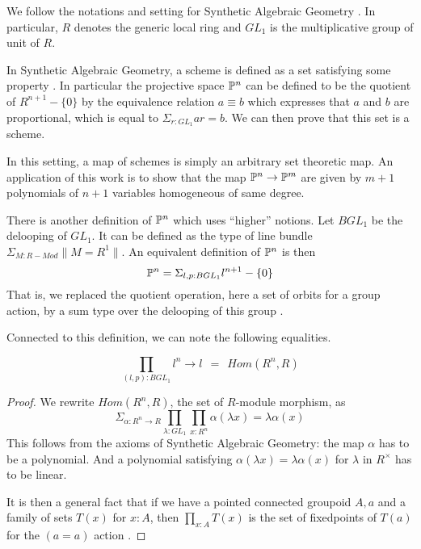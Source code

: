 We follow the notations and setting for Synthetic Algebraic Geometry \cite{draft}.
In particular, $R$ denotes the generic local ring and $GL_1$ is the multiplicative group of unit of $R$.

In Synthetic Algebraic Geometry, a scheme is defined as a set satisfying some property \cite{draft}. In particular
the projective space $\mathbb{P}^n$ can be defined to be the quotient of $R^{n+1}-\{0\}$ by the
equivalence relation $a\equiv b$ which expresses that $a$ and $b$ are proportional, %
which is equal to $\Sigma_{r:GL_1}ar = b$. We can then prove \cite{draft}
that this set is a scheme.

 In this setting, a map of schemes is simply an arbitrary set theoretic map. An application of this work is to show
 that the map $\mathbb{P}^n\rightarrow \mathbb{P}^m$ are given by $m+1$ polynomials of $n+1$ variables homogeneous of same degree.

\medskip


There is another definition of $\mathbb{P}^n$ which uses ``higher'' notions. Let $BGL_1$ be the delooping
of $GL_1$. It can be defined as the type of line bundle $\Sigma_{M:R-Mod}\|{M=R^1}\|$.
An equivalent definition of $\mathbb{P}^n$ is then \cite{Sym}
$$
\mathbb{P}^n = \Sigma_{l,p:BGL_1}l^{n+1}-\{0\}
$$
That is, we replaced the quotient operation, here a set of orbits for a group action, by a sum type over the delooping of this group
\cite{Sym}.

\medskip

Connected to this definition, we can note the following equalities.

\begin{proposition}\label{end}
  $$\prod_{(l,p):BGL_1}l^n\rightarrow l ~~=~~ Hom(R^n,R)$$
\end{proposition}

\begin{proof}
We rewrite $Hom(R^n,R)$, the set of $R$-module morphism, as
$$
\Sigma_{\alpha:R^n\rightarrow R}\prod_{\lambda:GL_1}\prod_{x:R^n}\alpha(\lambda x) = \lambda \alpha(x)
$$
This follows from the axioms of Synthetic Algebraic Geometry: the map $\alpha$ has to be a polynomial. And a polynomial
satisfying $\alpha(\lambda x) = \lambda \alpha(x)$ for $\lambda$ in $R^{\times}$ has to be linear.

\medskip

It is then a general fact that if we have a pointed connected groupoid $A,a$ and a family of
sets $T(x)$ for $x:A$, then $\prod_{x:A}T(x)$ is the set of fixedpoints of $T(a)$ for the $(a=a)$ action
\cite{Sym}.
\end{proof}

